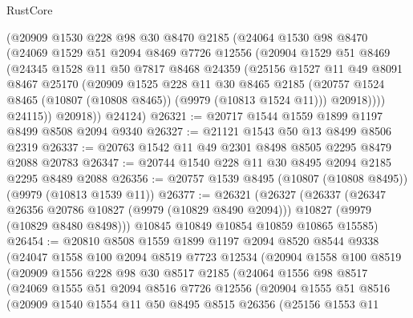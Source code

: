 \begin{lexlean}{RustCore}
\begin{coremodule}
        (@20909
          @1530
          @228
          @98
          @30
          @8470
          @2185
          (@24064
            @1530
            @98
            @8470
            (@24069
              @1529
              @51
              @2094
              @8469
              @7726
              @12556
              (@20904
                @1529
                @51
                @8469
                (@24345
                  @1528
                  @11
                  @50
                  @7817
                  @8468
                  @24359
                  (@25156
                    @1527
                    @11
                    @49
                    @8091
                    @8467
                    @25170
                    (@20909
                      @1525
                      @228
                      @11
                      @30
                      @8465
                      @2185
                      (@20757 @1524 @8465 (@10807 (@10808 @8465)) (@9979 (@10813 @1524 @11)))
                      @20918))))
              @24115))
          @20918))
      @24124)
@26321 := @20717 @1544 @1559 @1899 @1197 @8499 @8508 @2094 @9340
@26327 := @21121 @1543 @50 @13 @8499 @8506 @2319
@26337 := @20763 @1542 @11 @49 @2301 @8498 @8505 @2295 @8479 @2088 @20783
@26347 := @20744 @1540 @228 @11 @30 @8495 @2094 @2185 @2295 @8489 @2088
@26356 := @20757 @1539 @8495 (@10807 (@10808 @8495)) (@9979 (@10813 @1539 @11))
@26377 := @26321
    (@26327
      (@26337
        (@26347 @26356 @20786 @10827 (@9979 (@10829 @8490 @2094)))
        @10827
        (@9979 (@10829 @8480 @8498)))
      @10845
      @10849
      @10854
      @10859
      @10865
      @15585)
@26454 := @20810
    @8508
    @1559
    @1899
    @1197
    @2094
    @8520
    @8544
    @9338
    (@24047
      @1558
      @100
      @2094
      @8519
      @7723
      @12534
      (@20904
        @1558
        @100
        @8519
        (@20909
          @1556
          @228
          @98
          @30
          @8517
          @2185
          (@24064
            @1556
            @98
            @8517
            (@24069
              @1555
              @51
              @2094
              @8516
              @7726
              @12556
              (@20904
                @1555
                @51
                @8516
                (@20909
                  @1540
                  @1554
                  @11
                  @50
                  @8495
                  @8515
                  @26356
                  (@25156
                    @1553
                    @11

\end{coremodule}
\end{lexlean}
